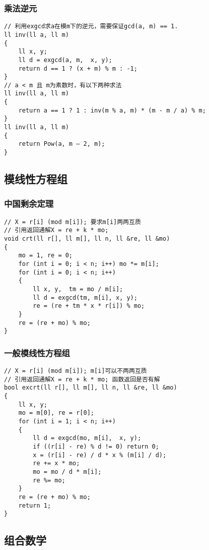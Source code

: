 \documentclass[a4]{article}
\begin{document}
\subsubsection{乘法逆元}
\begin{lstlisting}
// 利用exgcd求a在模m下的逆元，需要保证gcd(a, m) == 1.
ll inv(ll a, ll m)
{
    ll x, y;
    ll d = exgcd(a, m,  x, y);
    return d == 1 ? (x + m) % m : -1;
}
// a < m 且 m为素数时，有以下两种求法
ll inv(ll a, ll m)
{
    return a == 1 ? 1 : inv(m % a, m) * (m - m / a) % m;
}
ll inv(ll a, ll m)
{
    return Pow(a, m – 2, m);
}
\end{lstlisting}
\subsection{模线性方程组}
\subsubsection{中国剩余定理}
\begin{lstlisting}
// X = r[i] (mod m[i]); 要求m[i]两两互质
// 引用返回通解X = re + k * mo;
void crt(ll r[], ll m[], ll n, ll &re, ll &mo)
{
    mo = 1, re = 0;
    for (int i = 0; i < n; i++) mo *= m[i];
    for (int i = 0; i < n; i++)
    {
        ll x, y,  tm = mo / m[i];
        ll d = exgcd(tm, m[i], x, y);
        re = (re + tm * x * r[i]) % mo;
    }
    re = (re + mo) % mo;
}
\end{lstlisting}
\subsubsection{一般模线性方程组}
\begin{lstlisting}
// X = r[i] (mod m[i]); m[i]可以不两两互质
// 引用返回通解X = re + k * mo; 函数返回是否有解
bool excrt(ll r[], ll m[], ll n, ll &re, ll &mo)
{
    ll x, y;
    mo = m[0], re = r[0];
    for (int i = 1; i < n; i++)
    {
        ll d = exgcd(mo, m[i],  x, y);
        if ((r[i] - re) % d != 0) return 0;
        x = (r[i] - re) / d * x % (m[i] / d);
        re += x * mo;
        mo = mo / d * m[i];
        re %= mo;
    }
    re = (re + mo) % mo;
    return 1;
}
\end{lstlisting}
\subsection{组合数学}
\end{document}
